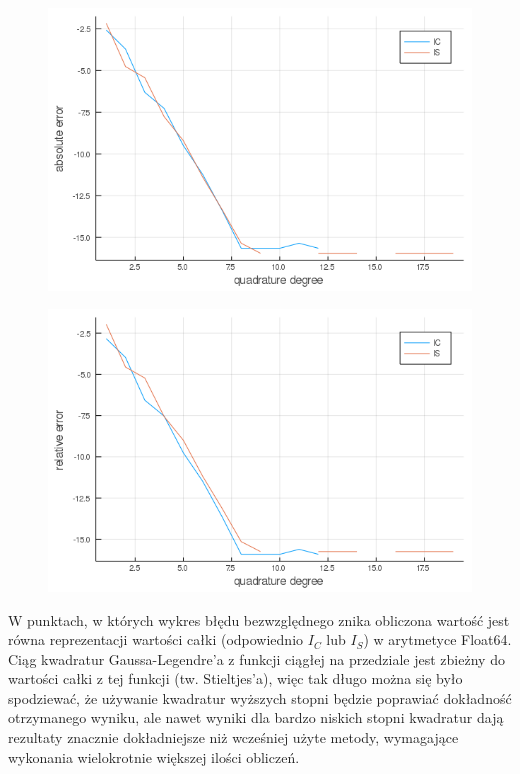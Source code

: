 \documentclass{article}
\begin{document}
\begin{figure}[ht]
    \includegraphics[scale=0.5]{WykresD1absolute.png}
    \label{wykresDabs}
\end{figure}
\begin{figure}[ht]
    \includegraphics[scale=0.5]{WykresD1relative.png}
    \label{wykresDrel}
\end{figure}

\newpage
W punktach, w których wykres błędu bezwzględnego znika obliczona wartość jest równa reprezentacji wartości całki (odpowiednio $I_C$ lub $I_S$) w arytmetyce Float64. Ciąg kwadratur Gaussa-Legendre'a z funkcji ciągłej na przedziale jest zbieżny do wartości całki z tej funkcji (tw. Stieltjes'a), więc tak długo można się było spodziewać, że używanie kwadratur wyższych stopni będzie poprawiać dokładność otrzymanego wyniku, ale nawet wyniki dla bardzo niskich stopni kwadratur dają rezultaty znacznie dokładniejsze niż wcześniej użyte metody, wymagające wykonania wielokrotnie większej ilości obliczeń.
\end{document}
